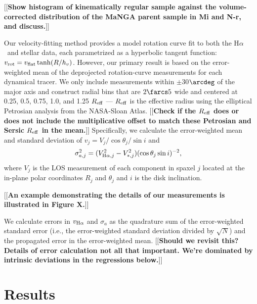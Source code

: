 \documentclass[apj,iop,revtex4,numberedappendix]{emulateapj}
\newcommand{\comment}[2][todo]{{\color{#1}[[{\bf #2}]]}}
\newcommand{\halpha}{H$\alpha$}
\begin{document}
\comment{Show histogram of kinematically regular sample against the
volume-corrected distribution of the MaNGA parent sample in Mi and N-r,
and discuss.}

Our velocity-fitting method provides a model rotation curve fit to both
the \halpha\ and stellar data, each parametrized as a hyperbolic tangent
function: $v_{\rm rot} = v_{\rm flat} \tanh(R/h_v)$.  However, our
primary result is based on the error-weighted mean of the deprojected
rotation-curve measurements for each dynamical tracer.  We only include
measurements within $\pm$30$\arcdeg$ of the major axis and construct
radial bins that are $2\farcs5$ wide and centered at 0.25, 0.5, 0.75,
1.0, and 1.25 $R_{\rm eff}$ --- $R_{\rm eff}$ is the effective radius
using the elliptical Petrosian analysis from the NASA-Sloan Atlas.
\comment{Check if the $R_{\rm eff}$ does or does not include the
multiplicative offset to match these Petrosian and Sersic $R_{\rm eff}$
in the mean.}  Specifically, we calculate the error-weighted mean and
standard deviation of $v_j = V_j/\cos\theta_j/\sin i$ and
%
\begin{equation}
%
\sigma_{a,j}^2 = (V_{{\rm H}\alpha,j}^2 - V_{\ast,j}^2) (\cos\theta_j
\sin i)^{-2},
%
\label{eq:dproj}
%
\end{equation}
%
where $V_j$ is the LOS measurement of each component in spaxel $j$
located at the in-plane polar coordinates $R_j$ and $\theta_j$ and $i$
is the disk inclination.

\comment{An example demonstrating the details of our measurements is
illustrated in Figure X.}

We calculate errors in $v_{{\rm H}\alpha}$ and $\sigma_a$ as the
quadrature sum of the error-weighted standard error (i.e., the
error-weighted standard deviation divided by $\sqrt{N}$) and the
propagated error in the error-weighted mean. \comment{Should we revisit
this?  Details of error calculation not all that important.  We're
dominated by intrinsic deviations in the regressions below.}

\section{Results}
\label{sec:results}
\end{document}
